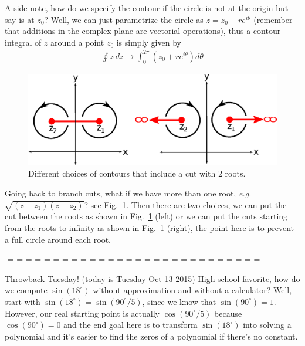 \documentclass[aps,preprint,preprintnumbers,nofootinbib,showpacs,prd]{revtex4-1}
\newcommand{\eg}{{\it e.g.} }
\newcommand{\nbea}{\begin{eqnarray*}}
\newcommand{\neea}{\end{eqnarray*}}
\begin{document}
A side note, how do we specify the contour if the circle is not at the origin but say is at $z_0$? Well, we can just parametrize the circle as $z = z_0 + r e^{i\theta}$ (remember that additions in the complex plane are vectorial operations), thus a contour integral of $z$ around a point $z_0$ is simply given by
%
\nbea
\oint z~dz \rightarrow \int_{0}^{2\pi} (z_0 + r e^{i\theta}) d\theta
\neea
%
%
\begin{figure}
\begin{center}
  \includegraphics[scale=0.7]{branch-cut-plots/2-root-cut.eps}
\end{center}
  \caption{\label{fig:2-root-cut}
Different choices of contours that include a cut with 2 roots.}
\end{figure}
%
Going back to branch cuts, what if we have more than one root, \eg $\sqrt{(z-z_1)(z-z_2)}$? see Fig.~\ref{fig:2-root-cut}. Then there are two choices, we can put the cut between the roots as shown in Fig.~\ref{fig:2-root-cut} (left) or we can put the cuts starting from the roots to infinity as shown in Fig.~\ref{fig:2-root-cut} (right), the point here is to prevent a full circle around each root.

-=-=-=-=-=-=-=-=-=-=-=-=-=-=-=-=-=-=-=-=-=-=-=-=-=-=-=-=-

Throwback Tuesday! (today is Tuesday Oct 13 2015) High school favorite, how do we compute $\sin(18^\circ)$ without approximation and without a calculator? Well, start with $\sin(18^\circ) = \sin(90^\circ/5)$, since we know that $\sin(90^\circ) = 1$. However, our real starting point is actually $\cos(90^\circ/5)$ because $\cos(90^\circ) = 0$ and the end goal here is to transform $\sin(18^\circ)$ into solving a polynomial and it's easier to find the zeros of a polynomial if there's no constant.
\end{document}
